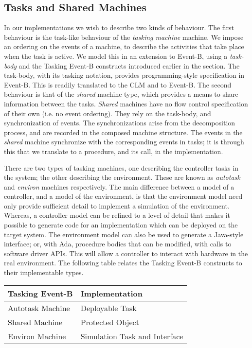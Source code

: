 \subsection{Tasks and Shared Machines}\label{tasks}
In our implementations we wish to describe two kinds of behaviour. The first behaviour is the task-like behaviour of the \emph{tasking machine} machine. We impose an ordering on the events of a machine, to describe the activities that take place when the task is active. We model this in an extension to Event-B, using a \emph{task-body} and the Tasking Event-B constructs introduced earlier in the section. The task-body, with its tasking notation, provides programming-style specification in Event-B. This is readily translated to the CLM and to Event-B. The second behaviour is that of the \emph{shared} machine type, which provides a means to share information between the tasks. \emph{Shared} machines have no flow control specification of their own (i.e. no event ordering). They rely on the task-body, and synchronization of events. The synchronizations arise from the decomposition process, and are recorded in the composed machine structure. The events in the \emph{shared} machine synchronize with the corresponding events in tasks; it is through this that we translate to a procedure, and its call, in the implementation. 

There are two types of tasking machines, one describing the controller tasks in the system; the other describing the environment. These are known as \emph{autotask} and \emph{environ} machines respectively. The main difference between a model of a controller, and a model of the environment, is that the environment model need only provide sufficient detail to implement a simulation of the environment. Whereas, a controller model can be refined to a level of detail that makes it possible to generate code for an implementation which can be deployed on the target system. The environment model can also be used to generate a Java-style interface; or, with Ada, procedure bodies that can be modified, with calls to software driver APIs. This will allow a controller to interact with hardware in the real environment. The following table relates the Tasking Event-B constructs to their implementable types.
%
\begin{center}
\begin{tabular}{l|l}
Tasking Event-B & Implementation \\ 
\hline
Autotask Machine & Deployable Task\\
Shared Machine &	Protected Object\\
Environ Machine &	Simulation Task and Interface
\end{tabular}
\end{center}


